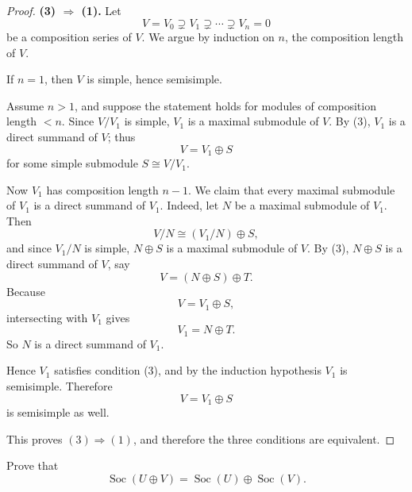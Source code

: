 \begin{proof}
    \medskip
    \noindent\textbf{(3) \(\Longrightarrow\) (1).}
    Let
    \[
        V=V_0\supsetneq V_1\supsetneq \cdots \supsetneq V_n=0
    \]
    be a composition series of \(V\).
    We argue by induction on \(n\), the composition length of \(V\).

    If \(n=1\), then \(V\) is simple, hence semisimple.

    Assume \(n>1\), and suppose the statement holds for modules of composition length \(<n\).
    Since \(V/V_1\) is simple, \(V_1\) is a maximal submodule of \(V\).
    By (3), \(V_1\) is a direct summand of \(V\); thus
    \[
        V=V_1\oplus S
    \]
    for some simple submodule \(S\cong V/V_1\).

    Now \(V_1\) has composition length \(n-1\).
    We claim that every maximal submodule of \(V_1\) is a direct summand of \(V_1\).
    Indeed, let \(N\) be a maximal submodule of \(V_1\).
    Then
    \[
        V/N \cong (V_1/N)\oplus S,
    \]
    and since \(V_1/N\) is simple, \(N\oplus S\) is a maximal submodule of \(V\).
    By (3), \(N\oplus S\) is a direct summand of \(V\), say
    \[
        V=(N\oplus S)\oplus T.
    \]
    Because
    \[
        V=V_1\oplus S,
    \]
    intersecting with \(V_1\) gives
    \[
        V_1=N\oplus T.
    \]
    So \(N\) is a direct summand of \(V_1\).

    Hence \(V_1\) satisfies condition (3), and by the induction hypothesis \(V_1\) is semisimple.
    Therefore
    \[
        V=V_1\oplus S
    \]
    is semisimple as well.

    This proves \((3)\Longrightarrow(1)\), and therefore the three conditions are equivalent.
\end{proof}

\begin{exercise}
    Prove that
    \[
        \operatorname{Soc}(U \oplus V)=\operatorname{Soc}(U)\oplus \operatorname{Soc}(V).
    \]
\end{exercise}


